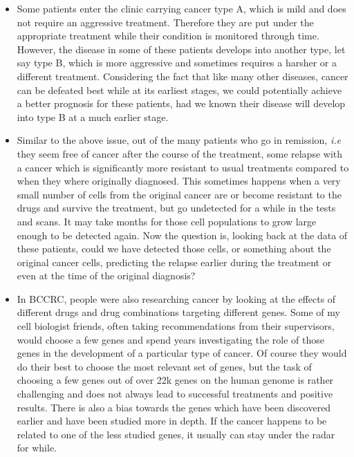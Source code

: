 \begin{itemize}
  \item Some patients enter the clinic carrying cancer type A, which is mild
    and does not require an aggressive treatment. Therefore they are put under
    the appropriate treatment while their condition is monitored through time.
    However, the disease in some of these patients develops into another type,
    let say type B, which is more aggressive and sometimes requires a harsher
    or a different treatment. Considering the fact that like many other
    diseases, cancer can be defeated best while at its earliest stages, we
    could potentially achieve a better prognosis for these patients, had we
    known their disease will develop into type B at a much earlier stage.

  \item Similar to the above issue, out of the many patients who go in
    remission, \emph{i.e} they seem free of cancer after the course of the
    treatment, some relapse with a cancer which is significantly more resistant
    to usual treatments compared to when they where originally diagnosed. This
    sometimes happens when a very small number of cells from the original
    cancer are or become resistant to the drugs and survive the treatment, but
    go undetected for a while in the tests and scans. It may take months for
    those cell populations to grow large enough to be detected again. Now the
    question is, looking back at the data of these patients, could we have
    detected those cells, or something about the original cancer cells,
    predicting the relapse earlier during the treatment or even at the time of
    the original diagnosis?

  \item In BCCRC, people were also researching cancer by looking at the effects
    of different drugs and drug combinations targeting different genes. Some of
    my cell biologist friends, often taking recommendations from their
    supervisors, would choose a few genes and spend years investigating the
    role of those genes in the development of a particular type of cancer. Of
    course they would do their best to choose the most relevant set of genes,
    but the task of choosing a few genes out of over 22k genes on the human
    genome is rather challenging and does not always lead to successful
    treatments and positive results. There is also a bias towards the genes
    which have been discovered earlier and have been studied more in depth. If
    the cancer happens to be related to one of the less studied genes, it
    usually can stay under the radar for while.
\end{itemize}

